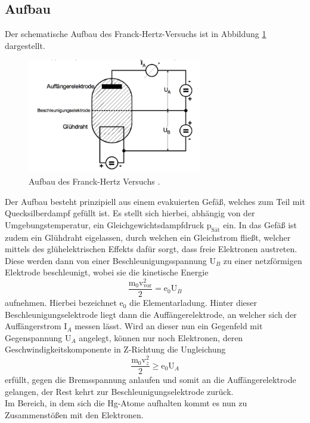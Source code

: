 \subsection{Aufbau}
Der schematische Aufbau des Franck-Hertz-Versuchs ist in Abbildung \ref{fig:Aufbau}
dargestellt.
\begin{figure}[H]
  \centering
  \includegraphics[height=5cm]{Aufbau.png}
  \caption{Aufbau des Franck-Hertz Versuchs \cite{skript}.}
  \label{fig:Aufbau}
\end{figure}
Der Aufbau besteht prinzipiell aus einem evakuierten Gefäß, welches zum Teil mit Quecksilberdampf
gefüllt ist. Es stellt sich hierbei, abhängig von der Umgebungstemperatur, ein Gleichgewichtsdampfdruck
$ \text{p}_{\text{Sät}}$ ein.
In das Gefäß ist zudem ein Glühdraht eigelassen, durch welchen ein Gleichstrom fließt, welcher
mittels des glühelektrischen Effekts dafür sorgt, dass freie Elektronen austreten.
Diese werden dann von einer Beschleunigungsspannung $ \text{U}_B$ zu einer netzförmigen
Elektrode beschleunigt, wobei sie die kinetische Energie
\begin{equation}
  \frac{\text{m}_0 \text{v}^2_{\text{vor}}}{2} = \text{e}_0 \text{U}_B
  \label{eqn:ekin}
\end{equation}
aufnehmen. Hierbei bezeichnet $\text{e}_0$ die Elementarladung.
Hinter dieser Beschleunigungselektrode liegt dann die Auffängerelektrode, an welcher
sich der Auffängerstrom $\text{I}_A$ messen lässt. Wird an dieser nun ein Gegenfeld mit
Gegenspannung $\text{U}_A$ angelegt, können nur noch Elektronen, deren Geschwindigkeitskomponente
in Z-Richtung die Ungleichung
\begin{equation}
  \frac{\text{m}_0 \text{v}^2_{z}}{2} \geq \text{e}_0 \text{U}_A
\end{equation}
erfüllt, gegen die Bremsspannung anlaufen und somit an die Auffängerelektrode gelangen, der Rest
kehrt zur Beschleunigungselektrode zurück. \\
Im Bereich, in dem sich die Hg-Atome aufhalten kommt es nun zu Zusammenstößen mit den Elektronen.
